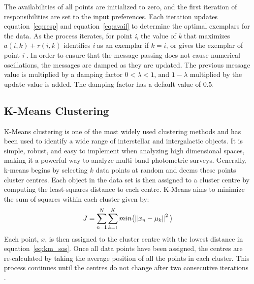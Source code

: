 The availabilities of all points are initialized to zero, and the first iteration of responsibilities are set to the input preferences.
Each iteration updates equation~\ref{eq:resp} and equation~\ref{eq:avail} to determine the optimal exemplars for the data.
As the process iterates, for point \textit{i}, the value of \textit{k} that maximizes $a(i,k) + r(i,k)$ identifies \textit{i} as an exemplar if $k=i$, or gives the exemplar of point \textit{i} \citet{frey07}.
In order to ensure that the message passing does not cause numerical oscillations, the messages are damped as they are updated.
The previous message value is multiplied by a damping factor $0 <\lambda<1$, and $1 - \lambda$ multiplied by the update value is added. %
The damping factor has a default value of 0.5. %


\subsection{K-Means Clustering}
K-Means clustering is one of the most widely used clustering methods and has been used to identify a wide range of interstellar and intergalactic objects. %
It is simple, robust, and easy to implement when analyzing high dimensional spaces, making it a powerful way to analyze multi-band photometric surveys. 
Generally, k-means begins by selecting $k$ data points at random and deems these points cluster centres. %
Each object in the data set is then assigned to a cluster centre by computing the least-squares distance to each centre.
K-Means aims to minimize the sum of squares within each cluster given by:
\begin{equation}
\label{eq:km_sos}
J = \sum_{n=1}^N \sum_{k=1}^K min \big( \norm{x_n - \mu_k}^2 \big)
\end{equation}
Each point, $x$, is then assigned to the cluster centre with the lowest distance in equation~\ref{eq:km_sos}. %
Once all data points have been assigned, the centres are re-calculated by taking the average position of all the points in each cluster. 
This process continues until the centres do not change after two consecutive iterations \citet{sanchez-almeida13}. %

